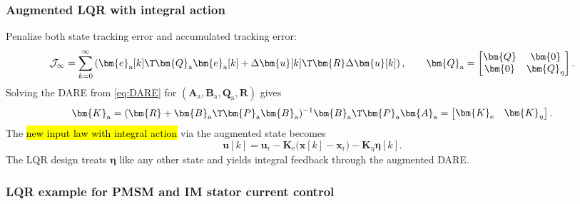 \begin{frame}
	\frametitle{Augmented LQR with integral action}
	Penalize both state tracking error and accumulated tracking error:
	\begin{equation}
		\mathcal{J}_\infty
		=\sum_{k=0}^{\infty}
		\left(\bm{e}_{\mathrm{a}}[k]\T\bm{Q}_{\mathrm{a}}\bm{e}_{\mathrm{a}}[k]
		+\Delta\bm{u}[k]\T\bm{R}\Delta\bm{u}[k]\right),
		\qquad
		\bm{Q}_{\mathrm{a}}=\begin{bmatrix}\bm{Q}&\bm{0}\\\bm{0}&\bm{Q}_{\eta}\end{bmatrix}.
	\end{equation}\pause%
	Solving the DARE from \eqref{eq:DARE} for $(\bm{A}_{\mathrm{a}},\bm{B}_{\mathrm{a}},\bm{Q}_{\mathrm{a}},\bm{R})$ gives
	\begin{equation}
		\bm{K}_{\mathrm{a}}
		=(\bm{R}+\bm{B}_{\mathrm{a}}\T\bm{P}_{\mathrm{a}}\bm{B}_{\mathrm{a}})^{-1}
		\bm{B}_{\mathrm{a}}\T\bm{P}_{\mathrm{a}}\bm{A}_{\mathrm{a}}
		=\begin{bmatrix}\bm{K}_{\mathrm{e}} & \bm{K}_{\eta}\end{bmatrix}.
	\end{equation}\pause%
	The \hl{new input law with integral action} via the augmented state becomes
	\begin{equation}
		\boxed{\bm{u}[k]=\bm{u}_{\mathrm{r}}
			-\bm{K}_{\mathrm{e}}\bigl(\bm{x}[k]-\bm{x}_{\mathrm{r}}\bigr)
			-\bm{K}_{\eta}\bm{\eta}[k].}
	\end{equation}
	The LQR design treats $\bm{\eta}$ like any other state and yields integral feedback through the augmented DARE.
\end{frame}

\subsubsection{LQR example for PMSM and IM stator current control}



